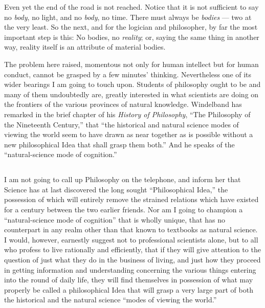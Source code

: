 \documentclass[a4paper, 11pt, oneside, polutonikogreek, english, landscape]{article}
\begin{document}
Even yet the end of the road is not reached. Notice that it is not sufficient to say no \emph{body}, no light, and no \emph{body}, no time. There must always be \emph{bodies} --- two at the very least. So the next, and for the logician and philosopher, by far the most important step is this: No bodies, no \emph{reality}; or, saying the same thing in another way, reality itself is an attribute of material bodies.

The problem here raised, momentous not only for human intellect but for human conduct, cannot be grasped by a few minutes' thinking. Nevertheless one of its wider bearings I am going to touch upon. Students of philosophy ought to be and many of them undoubtedly are, greatly interested in what scientists are doing on the frontiers of the various provinces of natural knowledge. Windelband has remarked in the brief chapter of his \emph{History of Philosophy}, ``The Philosophy of the Nineteenth Century,'' that ``the historical and natural science modes of viewing the world seem to have drawn as near together as is possible without a new philosophical Idea that shall grasp them both.'' And he speaks of the ``natural-science mode of cognition.''

\subsection{}
\paragraph{}
I am not going to call up Philosophy on the telephone, and inform her that Science has at last discovered the long sought ``Philosophical Idea,'' the possession of which will entirely remove the strained relations which have existed for a century between the two earlier friends. Nor am I going to champion a ``natural-science mode of cognition'' that is wholly unique, that has no counterpart in any realm other than that known to textbooks as natural science. I would, however, earnestly suggest not to professional scientists alone, but to all who profess to live rationally and efficiently, that if they will give attention to the question of just what they do in the business of living, and just how they proceed in getting information and understanding concerning the various things entering into the round of daily life, they will find themselves in possession of what may properly be called a philosophical Idea that will grasp a very large part of both the historical and the natural science ``modes of viewing the world.''
\end{document}
